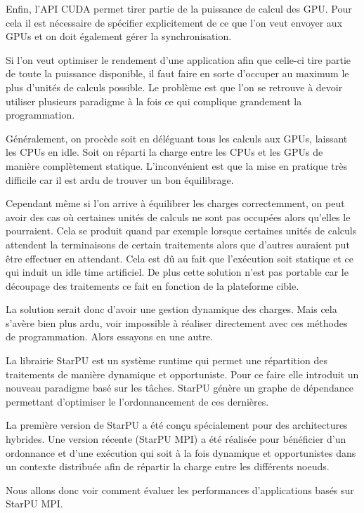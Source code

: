 \documentclass[smallextended]{svjour3}
\begin{document}
Enfin, l'API CUDA permet tirer partie de la puissance de calcul
des GPU. Pour cela il est nécessaire de spécifier explicitement de
ce que l'on veut envoyer aux GPUs et on doit également gérer la
synchronisation.  

Si l'on veut optimiser le rendement d'une application afin que
celle-ci tire partie de toute la puissance disponible, il faut faire
en sorte d'occuper au maximum le plus d'unités de calculs possible.  
Le problème est que l'on se retrouve à devoir utiliser plusieurs
paradigme à la fois ce qui complique grandement la programmation.

Généralement, on procède soit en déléguant tous les calculs aux
GPUs, laissant les CPUs en idle. Soit on réparti la charge entre les
CPUs et les GPUs de manière complètement statique. L'inconvénient
est que la mise en pratique très difficile car il est ardu de
trouver un bon équilibrage.

Cependant même si l'on arrive à équilibrer les charges
correctemment, on peut avoir des cas où certaines unités de
calculs ne sont pas occupées alors qu'elles le pourraient. Cela se
produit quand par exemple lorsque certaines unités de calculs
attendent la terminaisons de certain traitements alors que
d'autres auraient put être effectuer en attendant. Cela est dû au
fait que l'exécution soit statique et ce qui induit un idle time
artificiel. De plus cette solution n'est pas portable car le
découpage des traitements ce fait en fonction de la plateforme
cible.

La solution serait donc d'avoir une gestion dynamique des
charges. Mais cela s'avère bien plus ardu, voir impossible
à réaliser directement avec ces méthodes de programmation. Alors
essayons en une autre.

La librairie StarPU est un système runtime qui permet une
répartition des traitements de manière dynamique et opportuniste. 
Pour ce faire elle introduit un nouveau paradigme basé sur les
tâches. StarPU génère un graphe de dépendance permettant
d'optimiser le l'ordonnancement de ces dernières.

La première version de StarPU a été conçu spécialement pour des
architectures hybrides. Une version récente (StarPU MPI) a été
réalisée pour bénéficier d'un ordonnance et d'une exécution qui
soit à la fois dynamique et opportunistes dans un contexte
distribuée afin de répartir la charge entre les différents
noeuds.

Nous allons donc voir comment évaluer les performances
d'applications basés sur StarPU MPI.
\end{document}
